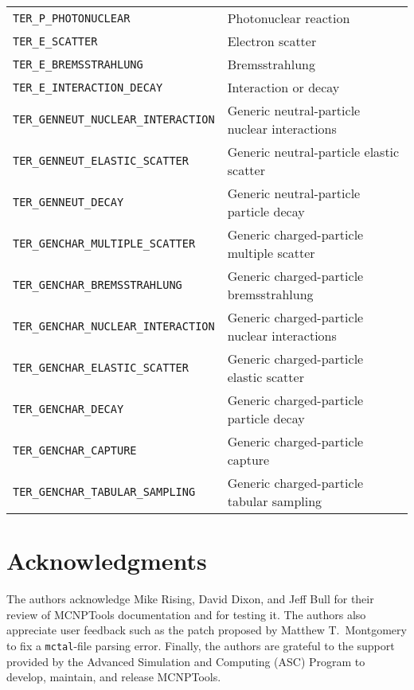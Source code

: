 \documentclass[11pt]{article}
\begin{document}
\begin{table}[]
\begin{center}
\begin{tabular}{lp{3.5in}}
        \texttt{TER\_P\_PHOTONUCLEAR}               & Photonuclear reaction \\
        \texttt{TER\_E\_SCATTER}                    & Electron scatter \\
        \texttt{TER\_E\_BREMSSTRAHLUNG}             & Bremsstrahlung \\
        \texttt{TER\_E\_INTERACTION\_DECAY}         & Interaction or decay \\
        \texttt{TER\_GENNEUT\_NUCLEAR\_INTERACTION} & Generic neutral-particle nuclear interactions \\
        \texttt{TER\_GENNEUT\_ELASTIC\_SCATTER}     & Generic neutral-particle elastic scatter \\
        \texttt{TER\_GENNEUT\_DECAY}                & Generic neutral-particle particle decay \\
        \texttt{TER\_GENCHAR\_MULTIPLE\_SCATTER}    & Generic charged-particle multiple scatter \\
        \texttt{TER\_GENCHAR\_BREMSSTRAHLUNG}       & Generic charged-particle bremsstrahlung \\
        \texttt{TER\_GENCHAR\_NUCLEAR\_INTERACTION} & Generic charged-particle nuclear interactions \\
        \texttt{TER\_GENCHAR\_ELASTIC\_SCATTER}     & Generic charged-particle elastic scatter \\
        \texttt{TER\_GENCHAR\_DECAY}                & Generic charged-particle particle decay \\
        \texttt{TER\_GENCHAR\_CAPTURE}              & Generic charged-particle capture \\
        \texttt{TER\_GENCHAR\_TABULAR\_SAMPLING}    & Generic charged-particle tabular sampling \\
      \bottomrule
    \end{tabular}
  \end{center}
\end{table}

\clearpage
\section{Acknowledgments}\label{acknowledgments}

The authors acknowledge Mike Rising, David Dixon, and Jeff Bull for their review
of MCNPTools documentation and for testing it.
The authors also appreciate user feedback such as the patch proposed by Matthew
T.~Montgomery to fix a \texttt{mctal}-file parsing error.
Finally, the authors are grateful to the support provided
by the Advanced Simulation and Computing (ASC) Program to develop, maintain, and
release MCNPTools.
\end{document}
